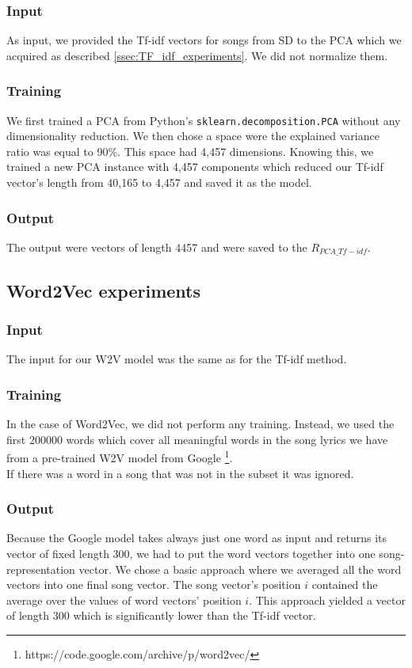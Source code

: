 \subsubsection{Input}
As input, we provided the Tf-idf vectors for songs from SD to the PCA which we acquired as described \ref{ssec:TF_idf_experiments}. We did not normalize them.

\subsubsection{Training}
We first trained a PCA from Python's \texttt{sklearn.decomposition.PCA} without any dimensionality reduction. We then chose a space were the explained variance ratio was equal to 90\%. This space had 4,457 dimensions. Knowing this, we trained a new PCA instance with 4,457 components which reduced our Tf-idf vector's length from 40,165 to 4,457 and saved it as the model.

\subsubsection{Output}
The output were vectors of length 4457 and were saved to the $R_{PCA\_Tf-idf}$.

\subsection{Word2Vec experiments}\label{ssec:w2v_experiments}

\subsubsection{Input}
The input for our W2V model was the same as for the Tf-idf method.

\subsubsection{Training}
In the case of Word2Vec, we did not perform any training. Instead, we used the first 200000 words which cover all meaningful words in the song lyrics we have from a pre-trained W2V model from Google \footnote{https://code.google.com/archive/p/word2vec/}. \\
If there was a word in a song that was not in the subset it was ignored. 

\subsubsection{Output}
Because the Google model takes always just one word as input and returns its vector of fixed length 300, we had to put the word vectors together into one song-representation vector. We chose a basic approach where we averaged all the word vectors into one final song vector. The song vector's position $i$ contained the average over the values of word vectors' position $i$. This approach yielded a vector of length 300 which is significantly lower than the Tf-idf vector.\\

